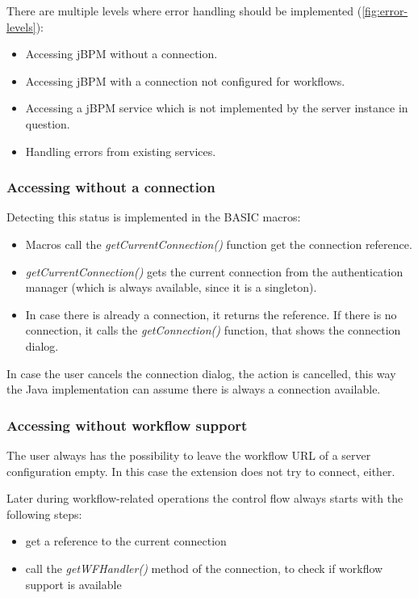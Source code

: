 There are multiple levels where error handling should be implemented
(\autoref{fig:error-levels}):

\begin{itemize}
\item Accessing jBPM without a connection.
\item Accessing jBPM with a connection not configured for workflows.
\item Accessing a jBPM service which is not implemented by the server instance in question.
\item Handling errors from existing services.
\end{itemize}

\subsubsection*{Accessing without a connection}

Detecting this status is implemented in the BASIC macros:

\begin{itemize}
\item Macros call the \emph{getCurrentConnection()} function get the connection reference.
\item \emph{getCurrentConnection()} gets the current connection from the authentication manager (which is always available, since it is a singleton).
\item In case there is already a connection, it returns the reference. If there is no connection, it calls the \emph{getConnection()} function, that shows the connection dialog.
\end{itemize}

In case the user cancels the connection dialog, the action is cancelled, this
way the Java implementation can assume there is always a connection available.

\subsubsection*{Accessing without workflow support}

The user always has the possibility to leave the workflow URL of a server
configuration empty. In this case the extension does not try to connect,
either.

Later during workflow-related operations the control flow always starts with the following steps:

\begin{itemize}
\item get a reference to the current connection
\item call the \emph{getWFHandler()} method of the connection, to check if workflow support is available
\end{itemize}

